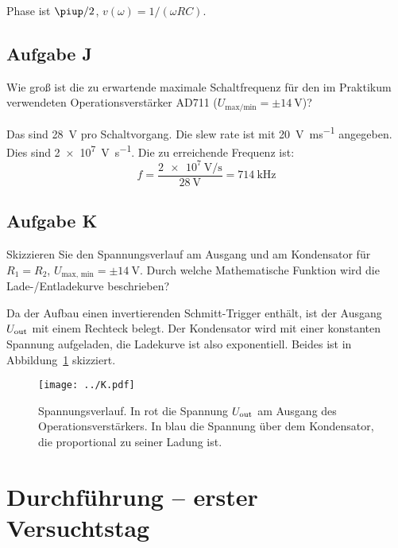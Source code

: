 Phase ist $\piup/2$, $v(\omega) = 1 / (\omega RC)$.

\subsection{Aufgabe J}

\begin{problem}
	Wie groß ist die zu erwartende maximale Schaltfrequenz für den im Praktikum
	verwendeten Operationsverstärker AD711 ($U_\text{max/min} = \pm
	\SI{14}\volt$)?
\end{problem}

Das sind \SI{28}{\volt} pro Schaltvorgang. Die slew rate ist mit
\SI{20}{\volt\per\milli\second} angegeben. Dies sind
\SI{2e7}{\volt\per\second}. Die zu erreichende Frequenz ist:
\[
	f = \frac{\SI{2e7}{\volt\per\second}}{\SI{28}\volt} = \SI{714}{\kilo\hertz}
\]

\FloatBarrier
\subsection{Aufgabe K}

\begin{problem}
	Skizzieren Sie den Spannungsverlauf am Ausgang und am Kondensator für $R_1
	= R_2$, $U_\text{max, min} = \pm \SI{14}\volt$. Durch welche Mathematische
	Funktion wird die Lade-/Entladekurve beschrieben?
\end{problem}

Da der Aufbau einen invertierenden Schmitt-Trigger enthält, ist der Ausgang
$U_\text{out}$ mit einem Rechteck belegt. Der Kondensator wird mit einer konstanten
Spannung aufgeladen, die Ladekurve ist also exponentiell. Beides ist in
Abbildung~\ref{fig:K} skizziert.

\begin{figure}[htbp]
	\centering
	\texttt{[image: ../K.pdf]}
	\caption{%
		Spannungsverlauf. In rot die Spannung $U_\text{out}$ am Ausgang des
		Operationsverstärkers. In blau die Spannung über dem Kondensator, die
		proportional zu seiner Ladung ist.
	}
	\label{fig:K}
\end{figure}


\FloatBarrier
\section{Durchführung – erster Versuchtstag}

